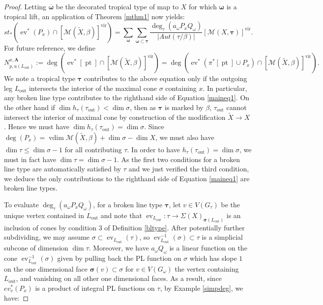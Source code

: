 \documentclass[12pt, oneside]{amsart}   	%
\newcounter{thm}
\newcommand{\vir}{\operatorname{vir}}
\newcommand{\vdim}{\operatorname{vdim}}
\newcommand{\pt}{\operatorname{pt}}
\newcommand{\ev}{\operatorname{ev}}
\newcommand{\out}{\operatorname{out}}
\numberwithin{equation}{section}
\numberwithin{thm}{section}
\numberwithin{figure}{section}
\begin{document}
\begin{proof}
Letting $\overline{\pmb\omega}$ be the decorated tropical type of map to $X$ for which $\pmb\omega$ is a tropical lift, an application of Theorem \ref{mthm1} now yields:
 \begin{equation}\label{pushbl}
st_*(\ev^*(P_x)\cap[\mathscr{M}(\widetilde{X},\beta)]^{\vir}) = \sum_{\pmb\omega}  \sum_{\overline{\pmb\omega}\subset\pmb\tau} \frac{\deg_{\tau}(a_{\omega}P_xQ_{\omega})}{|Aut(\tau/\beta)|}[\mathscr{M}(X,\pmb\tau)]^{\vir}.
\end{equation}
For future reference, we define 
$$N_{p,u(L_{\out})}^{x,\textbf{A}}:= \deg(\ev^*[\pt]\cap[\mathscr{M}(\widetilde{X},\beta)]^{\vir}) = \deg(\ev^*(\pi^*[\pt]\cup P_x)\cap[\mathscr{M}(\widetilde{X},\beta)]^{\vir}).$$
 We note a tropical type $\pmb\tau$ contributes to the above equation only if the outgoing leg $L_{\out}$ intersects the interior of the maximal cone $\sigma$ containing $x$. In particular, any broken line type contributes to the righthand side of Equation \ref{maineq1}. On the other hand if $\dim h_{\tau}(\tau_{\out}) < \dim \sigma$, then as $\pmb\tau$ is marked by $\beta$, $\tau_{\out}$ cannot intersect the interior of maximal cone by construction of the modification $\widetilde{X} \rightarrow X$. Hence we must have $\dim h_{\tau}(\tau_{\out}) = \dim \sigma$. Since $\deg(P_x) = \vdim \mathscr{M}(\widetilde{X},\beta) +\dim \sigma - \dim X$, we must also have $\dim\tau \le \dim \sigma-1$ for all contributing $\tau$. In order to have $h_{\tau}(\tau_{\out}) = \dim \sigma$, we must in fact have $\dim \tau = \dim \sigma-1$. As the first two conditions for a broken line type are automatically satisfied by $\tau$ and we just verified the third condition, we deduce the only contributions to the righthand side of Equation \ref{maineq1} are broken line types.


To evaluate $\deg_{\tau}(a_\omega P_xQ_{\omega})$, for a broken line type $\pmb\tau$, let $v \in V(G_{\tau})$ be the unique vertex contained in $L_{\out}$ and note that $\ev_{L_{\out}}: \tau \rightarrow \Sigma(X)_{\pmb\sigma(L_{\out})}$ is an inclusion of cones by condition $3$ of Definition \ref{bltype}. After potentially further subdividing, we may assume $\sigma\subset \ev_{L_{\out}}(\tau)$, so $\ev_{L_{\out}}^{-1}(\sigma) \subset \tau$ is a simplicial subcone of dimension $\dim\tau$. Moreover, we have $a_\omega Q_{\omega}$ is a linear function on the cone $\ev_{L_{\out}}^{-1}(\sigma)$ given by pulling back the PL function on $\sigma$ which has slope $1$ on the one dimensional face $\pmb\sigma(v) \subset \sigma$ for $v \in V(G_{\omega})$ the vertex containing $L_{\out}$, and vanishing on all other one dimensional faces. As a result, since $ev_v^*(P_x)$ is a product of integral PL functions on $\tau$, by Example \ref{simpdeg}, we have:


\end{proof}
\end{document}
